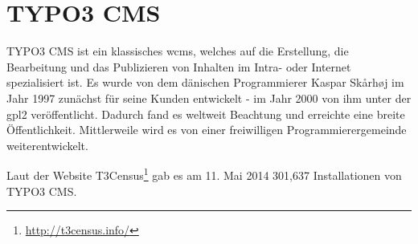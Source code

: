 \section{TYPO3 CMS}
\label{sec:typo3cms}
TYPO3 CMS ist ein klassisches \gls{wcms}, welches auf die Erstellung, die Bearbeitung und das Publizieren von Inhalten im Intra- oder Internet spezialisiert ist. Es wurde von dem dänischen Programmierer Kaspar Skårhøj im Jahr 1997 zunächst für seine Kunden entwickelt - im Jahr 2000 von ihm unter der \gls{gpl2} veröffentlicht. Dadurch fand es weltweit Beachtung und erreichte eine breite Öffentlichkeit. Mittlerweile wird es von einer freiwilligen Programmierergemeinde weiterentwickelt.

Laut der Website T3Census\footnote{\url{http://t3census.info/}} gab es am 11. Mai 2014 301,637 Installationen von TYPO3 CMS.



